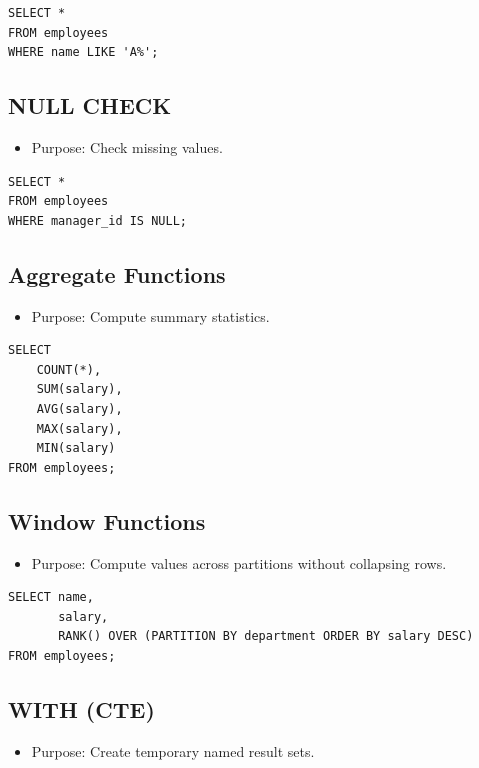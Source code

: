 \documentclass[10pt]{article}
\begin{document}
\begin{verbatim}
SELECT *
FROM employees
WHERE name LIKE 'A%';
\end{verbatim}

\subsection{NULL CHECK}
\begin{itemize}
    \item Purpose: Check missing values.
\end{itemize}

\begin{verbatim}
SELECT *
FROM employees
WHERE manager_id IS NULL;
\end{verbatim}

\subsection{\textbf{Aggregate Functions}}
\begin{itemize}
    \item Purpose: Compute summary statistics.
\end{itemize}

\begin{verbatim}
SELECT
    COUNT(*),
    SUM(salary),
    AVG(salary),
    MAX(salary),
    MIN(salary)
FROM employees;
\end{verbatim}

\subsection{Window Functions}
\begin{itemize}
    \item Purpose: Compute values across partitions without collapsing rows.
\end{itemize}

\begin{verbatim}
SELECT name,
       salary,
       RANK() OVER (PARTITION BY department ORDER BY salary DESC)
FROM employees;
\end{verbatim}

\subsection{WITH (CTE)}
\begin{itemize}
    \item Purpose: Create temporary named result sets.
\end{itemize}
\end{document}
